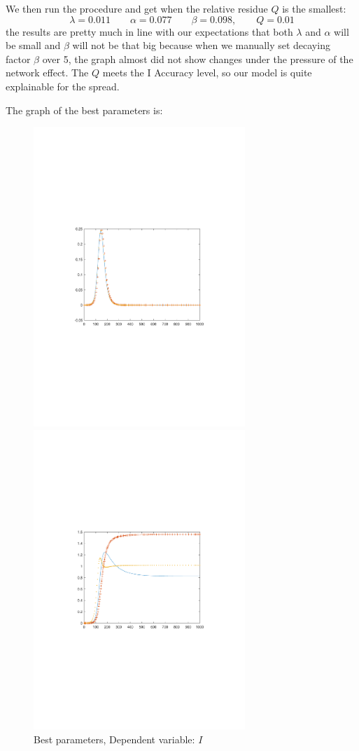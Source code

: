 \documentclass{mcmthesis}
\begin{document}
We then run the procedure and get when the relative residue $Q$ is the smallest:
$$\lambda=0.011 \qquad \alpha=0.077 \qquad \beta=0.098, \qquad Q=0.01$$ the results are pretty much in line with our expectations that both $\lambda$ and $\alpha$ will be small and $\beta$ will not be that big because when we manually set decaying factor $\beta$ over 5, the graph almost did not show changes under the pressure of the network effect. The $Q$ meets the I Accuracy level, so our model is quite explainable for the spread. 

The graph of the best parameters is:

\begin{figure}[htbp!]
  \begin{flushleft}
  	\begin{minipage}[t]{0.3\textwidth}
  \centering
  \includegraphics[width=8cm]{figures/f4}
  \caption{Best parameters, Dependent variable: $I$}
  \end{minipage}
  \qquad\qquad\qquad\qquad
  	\begin{minipage}[t]{0.3\textwidth}
  \centering
  \includegraphics[width=8cm]{figures/f3}

\end{minipage}
\end{flushleft}
\end{figure}
\end{document}
